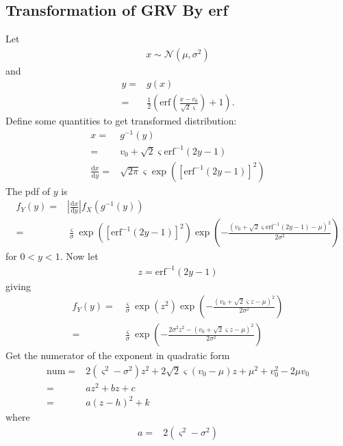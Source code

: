 \documentclass{article}
\begin{document}
{\subsection*{Transformation of GRV By erf}
Let
\begin{align}
	x\sim\mathcal{N}\left(\mu,\sigma^2\right)
\end{align}
and
\begin{align}
	y =& g(x) \\
	=& \frac{1}{2}\left(\mathrm{erf}\left(\frac{x-v_0}{\sqrt{2}\varsigma}\right) + 1\right).
\end{align}
Define some quantities to get transformed distribution:
\begin{align}
	x =& g^{-1}(y) \\
	  =& v_0 + \sqrt{2}\varsigma\mathrm{erf}^{-1}\left(2y-1\right) \\
	\frac{\mathrm{d}x}{\mathrm{d}y} =& \sqrt{2\pi}\varsigma\exp \left( \left[\mathrm{erf}^{-1}\left(2y-1\right)\right]^2\right)
\end{align}
The pdf of $y$ is
\begin{align}
	f_Y(y) =& \left|\frac{\mathrm{d}x}{\mathrm{d}y}\right|f_X(g^{-1}(y)) \\
	=& \frac{\varsigma}{\sigma}\exp\left(\left[\mathrm{erf}^{-1}\left(2y-1\right)\right]^2\right)\exp\left(-\frac{\left(v_0 + \sqrt{2}\varsigma\mathrm{erf}^{-1}\left(2y-1\right) - \mu\right)^2}{2\sigma^2}\right)
\end{align}
for $0<y<1$. Now let
\begin{align}
	z = \mathrm{erf}^{-1}\left(2y-1\right)
\end{align}
giving
\begin{align}
	f_Y(y)=& \frac{\varsigma}{\sigma}\exp\left(z^2\right)\exp\left(-\frac{\left(v_0 + \sqrt{2}\varsigma z - \mu\right)^2}{2\sigma^2}\right) \\
	=& \frac{\varsigma}{\sigma}\exp\left(-\frac{2\sigma^2 z^2 - \left(v_0 + \sqrt{2}\varsigma z - \mu\right)^2}{2\sigma^2}\right)
\end{align}
Get the numerator of the exponent in quadratic form
\begin{align}
	\mathrm{num} =& 2\left(\varsigma^2 - \sigma^2\right)z^2 + 2\sqrt{2}\varsigma\left(v_0-\mu\right)z + \mu^2 + v_0^2 - 2\mu v_0 \\
	=& az^2 + bz + c \\
	=& a\left(z-h\right)^2 + k
\end{align}
where
\begin{align}
	a =& 2\left(\varsigma^2 - \sigma^2\right) \nonumber \\

\end{align}}
\end{document}
